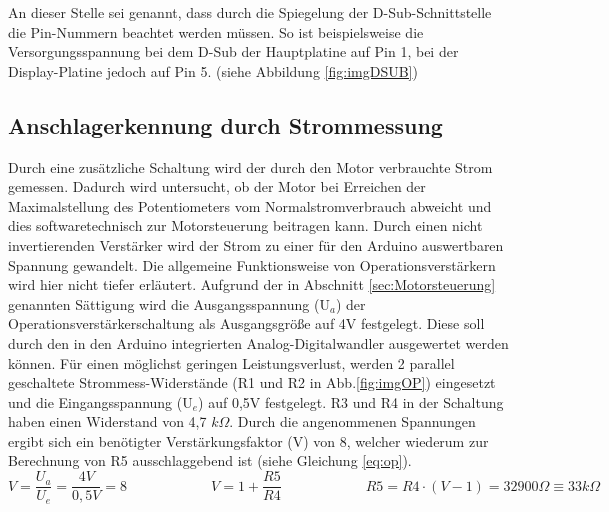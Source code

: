 \documentclass[11pt, titlepage]{report}
\begin{document}
				An dieser Stelle sei genannt, dass durch die Spiegelung der D-Sub-Schnittstelle die Pin-Nummern beachtet werden müssen. So ist beispielsweise die Versorgungsspannung bei dem D-Sub der Hauptplatine auf Pin 1, bei der Display-Platine jedoch auf Pin 5. (siehe Abbildung \ref{fig:imgDSUB})
			\newpage
			\subsection{Anschlagerkennung durch Strommessung}
			\label{sec:op}
				 Durch eine zusätzliche Schaltung wird der durch den Motor verbrauchte Strom gemessen. Dadurch wird untersucht, ob der Motor bei Erreichen der Maximalstellung des Potentiometers vom Normalstromverbrauch abweicht und dies softwaretechnisch zur Motorsteuerung beitragen kann. Durch einen nicht invertierenden Verstärker wird der Strom zu einer für den Arduino auswertbaren Spannung gewandelt. Die allgemeine Funktionsweise von Operationsverstärkern wird hier nicht tiefer erläutert. 
				 \newline Aufgrund der in Abschnitt \ref{sec:Motorsteuerung} genannten Sättigung wird die Ausgangsspannung (U$_{a}$) der Operationsverstärkerschaltung als Ausgangsgröße auf 4V festgelegt. Diese soll durch den in den Arduino integrierten Analog-Digitalwandler ausgewertet werden können. Für einen möglichst geringen Leistungsverlust, werden 2 parallel geschaltete Strommess-Widerstände (R1 und R2 in Abb.\ref{fig:imgOP}) eingesetzt und die Eingangsspannung (U$_{e}$) auf 0,5V festgelegt. R3 und R4 in der Schaltung haben einen Widerstand von 4,7 $k\Omega$. Durch die angenommenen Spannungen ergibt sich ein benötigter Verstärkungsfaktor (V) von 8, welcher wiederum zur Berechnung von R5 ausschlaggebend ist (siehe Gleichung \ref{eq:op}).
				\vspace*{1.5em}
				\begin{equation}
					\label{eq:op}
					V = \frac{U_a}{U_e} =\frac{4V}{0,5V}= 8 \hspace{6em} V = 1+\frac{R5}{R4} \hspace{6em} R5 = R4\cdot(V-1) = 32900\Omega \equiv 33k\Omega
				\end{equation}
\end{document}

